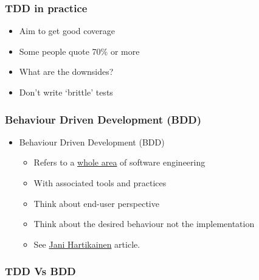 \subsubsection{TDD in practice}\label{tdd-in-practice}

\begin{itemize}
\itemsep1pt\parskip0pt
\item
  Aim to get good coverage
\item
  Some people quote 70\% or more
\item
  What are the downsides?
\item
  Don't write `brittle' tests
\end{itemize}

\subsubsection{Behaviour Driven Development
(BDD)}\label{behaviour-driven-development-bdd}

\begin{itemize}
\itemsep1pt\parskip0pt
\item
  Behaviour Driven Development (BDD)

  \begin{itemize}
  \itemsep1pt\parskip0pt
  \item
    Refers to a
    \href{https://en.wikipedia.org/wiki/Behavior-driven_development}{whole
    area} of software engineering
  \item
    With associated tools and practices
  \item
    Think about end-user perspective
  \item
    Think about the desired behaviour not the implementation
  \item
    See
    \href{https://codeutopia.net/blog/2015/03/01/unit-testing-tdd-and-bdd/}{Jani
    Hartikainen} article.
  \end{itemize}
\end{itemize}

\subsubsection{TDD Vs BDD}\label{tdd-vs-bdd}

